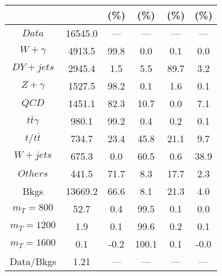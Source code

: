 \begin{figure}
\begin{minipage}[c]{0.32\textwidth}
{\begin{tabular}{cccccc}
 &  & (\%) & (\%) & (\%) & (\%)  \\
\hline
                                                                      $ Data $ &  16545.0 &  --- &  --- &  --- &  ---\\
$ W+\gamma $ &  4913.5 &  99.8 &  0.0 &  0.1 &  0.0\\
$ DY+jets $ &  2945.4 &  1.5 &  5.5 &  89.7 &  3.2\\
$ Z+\gamma $ &  1527.5 &  98.2 &  0.1 &  1.6 &  0.1\\
$ QCD $ &  1451.1 &  82.3 &  10.7 &  0.0 &  7.1\\
$ t\bar{t}\gamma $ &  980.1 &  99.2 &  0.4 &  0.2 &  0.1\\
$ t/t\bar{t} $ &  734.7 &  23.4 &  45.8 &  21.1 &  9.7\\
$ W+jets $ &  675.3 &  0.0 &  60.5 &  0.6 &  38.9\\
$ Others $ &  441.5 &  71.7 &  8.3 &  17.7 &  2.3\\
Bkgs &  13669.2 &  66.6 &  8.1 &  21.3 &  4.0\\
$ m_{T} = 800 $ &  52.7 &  0.4 &  99.5 &  0.1 &  0.0\\
$ m_{T} = 1200 $ &  1.9 &  0.1 &  99.6 &  0.2 &  0.1\\
$ m_{T} = 1600 $ &  0.1 &  -0.2 &  100.1 &  0.1 &  -0.0\\
Data/Bkgs &  1.21 &  --- &  --- &  --- &  ---\\
\hline
\end{tabular}
}
\end{minipage}
\end{figure}

